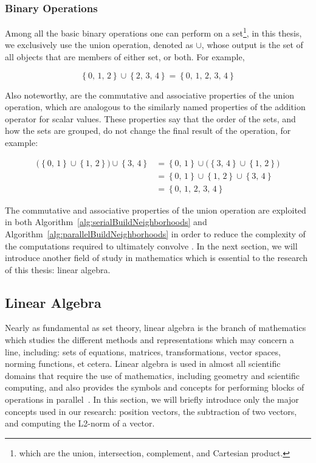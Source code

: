 %
%
\subsubsection{Binary Operations}
\label{ch2sETBssSTsssBO}
Among all the basic binary operations one can perform on a set\footnote{which are the union, intersection, complement, and Cartesian product.}, in this thesis, we exclusively use the union operation, denoted as $\cup$, whose output is the set of all objects that are members of either set, or both. For example,

\begin{equation}
	\left \{0,\,1,\,2\right \} \cup \left \{2,\,3,\,4\right \} = \left \{0,\,1,\,2,\,3,\,4\right \}
\end{equation}

Also noteworthy, are the commutative and associative properties of the union~\cite{Halmos13} operation, which are analogous to the similarly named properties of the addition operator for scalar values. These properties say that the order of the sets, and how the sets are grouped, do not change the final result of the operation, for example:

\begin{equation}
\begin{aligned}
	\big( \left \{0,\,1\right \} \cup \left \{1,\,2\right \} \big) \cup \left \{3,\,4\right \} & = \left \{0,\,1\right \} \cup \big( \left \{3,\,4\right \} \cup \left \{1,\,2\right \}\big) \\
	& = \left \{0,\,1\right \} \cup \left \{1,\,2\right \} \cup \left \{3,\,4\right \} \\
	& = \left \{0,\,1,\,2,\,3,\,4\right \}
	\label{eq:ascAndComPropertiesOfUnions}
\end{aligned}
\end{equation}

The commutative and associative properties of the union operation are exploited in both Algorithm~\ref{alg:serialBuildNeighborhoods} and Algorithm~\ref{alg:parallelBuildNeighborhoods} in order to reduce the complexity of the computations required to ultimately convolve . In the next section, we will introduce another field of study in mathematics which is essential to the research of this thesis: linear algebra.

%
%
%
%
\subsection{Linear Algebra}
\label{ch2sETBssLA}
Nearly as fundamental as set theory, linear algebra is the branch of mathematics which studies the different methods and representations which may concern a line, including: sets of equations, matrices, transformations, vector spaces, norming functions, et cetera. Linear algebra is used in almost all scientific domains that require the use of mathematics, including geometry and scientific computing, and also provides the symbols and concepts for performing blocks of operations in parallel~\cite{Weisstein19i}. In this section, we will briefly introduce only the major concepts used in our research: position vectors, the subtraction of two vectors, and computing the L2-norm of a vector.

